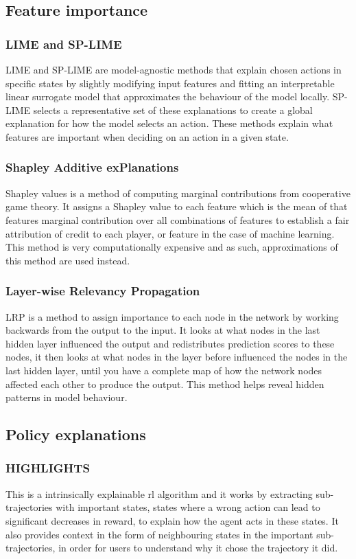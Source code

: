\documentclass[UKenglish]{uiomasterthesis}
\begin{document}
\subsection{Feature importance}

\subsubsection{LIME and SP-LIME}
LIME and SP-LIME are model-agnostic methods that explain chosen actions in specific states by slightly modifying input features and fitting an interpretable linear surrogate model that approximates the behaviour of the model locally. SP-LIME selects a representative set of these explanations to create a global explanation for how the model selects an action. These methods explain what features are important when deciding on an action in a given state.

\subsubsection{Shapley Additive exPlanations}
Shapley values is a method of computing marginal contributions from cooperative game theory. It assigns a Shapley value to each feature which is the mean of that features marginal contribution over all combinations of features to establish a fair attribution of credit to each player, or feature in the case of machine learning. This method is very computationally expensive and as such, approximations of this method are used instead.

\subsubsection{Layer-wise Relevancy Propagation}
LRP is a method to assign importance to each node in the network by working backwards from the output to the input. It looks at what nodes in the last hidden layer influenced the output and redistributes prediction scores to these nodes, it then looks at what nodes in the layer before influenced the nodes in the last hidden layer, until you have a complete map of how the network nodes affected each other to produce the output. This method helps reveal hidden patterns in model behaviour.

\subsection{Policy explanations}

\subsubsection{HIGHLIGHTS}
This is a intrinsically explainable \ac{rl} algorithm and it works by extracting sub-trajectories with important states, states where a wrong action can lead to significant decreases in reward, to explain how the agent acts in these states. It also provides context in the form of neighbouring states in the important sub-trajectories, in order for users to understand why it chose the trajectory it did.
\end{document}
